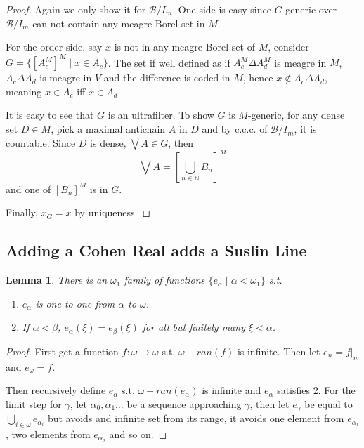 \documentclass{article}
\newtheorem{lemma}{Lemma}
\begin{document}
\begin{proof}
    Again we only show it for $\mathcal{B}/I_m$. One side is easy since $G$ generic over $\mathcal{B}/I_m$ can not contain any meagre Borel set in $M$.

    For the order side, say $x$ is not in any meagre Borel set of $M$, consider $G = \{[A_c^M]^M\mid x\in A_c\}$. The set if well defined as if $A_c^M\Delta A_d^M$ is meagre in $M$, $A_c\Delta A_d$ is meagre in $V$ and the difference is coded in $M$, hence $x\not\in A_c\Delta A_d$, meaning $x\in A_c$ iff $x\in A_d$.

    It is easy to see that $G$ is an ultrafilter. To show $G$ is $M$-generic, for any dense set $D\in M$, pick a maximal antichain $A$ in $D$ and by c.c.c. of $\mathcal{B}/I_m$, it is countable. Since $D$ is dense, $\bigvee A\in G$, then $$\bigvee A = [\bigcup_{n\in \mathbb{N}}B_n]^M$$and one of $[B_n]^M$ is in $G$.

    Finally, $x_G = x$ by uniqueness.
\end{proof}

\subsection{Adding a Cohen Real adds a Suslin Line}



\begin{lemma}
    There is an $\omega_1$ family of functions $\{e_\alpha\mid \alpha<\omega_1\}$ s.t. 
    \begin{enumerate}
        \item $e_\alpha$ is one-to-one from $\alpha$ to $\omega$.
        \item If $\alpha<\beta$, $e_\alpha(\xi) = e_\beta(\xi)$ for all but finitely many $\xi<\alpha$.
    \end{enumerate}
\end{lemma}

\begin{proof}
    First get a function $f:\omega\to \omega$ s.t. $\omega - ran(f)$ is infinite. Then let $e_n = f|_n$ and $e_\omega = f$.

    Then recursively define $e_\alpha$ s.t. $\omega - ran(e_\alpha)$ is infinite and $e_\alpha$ satisfies 2. For the limit step for $\gamma$, let $\alpha_0,\alpha_1\dots$ be a sequence approaching $\gamma$, then let $e_\gamma$ be equal to $\bigcup_{i\in \omega}e_{\alpha_i}$ but avoids and infinite set from its range, it avoids one element from $e_{\alpha_1}$, two elements from $e_{\alpha_2}$ and so on.
\end{proof}
\end{document}
